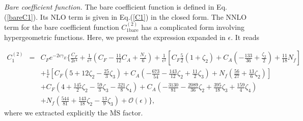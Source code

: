\documentclass[aps,prl,twocolumn,secnumarabic,notitlepage,superscriptaddress,nofootinbib,tightenlines,floatfix,preprintnumbers]{revtex4-1}
\newcommand{\nn}{\nonumber}
\renewcommand{\(}{\left(}
\renewcommand{\)}{\right)}
\renewcommand{\[}{\left[}
\renewcommand{\]}{\right]}
\begin{document}
\textit{Bare coefficient function.} The bare coefficient function is defined in Eq. (\ref{bareC1}). Its NLO term is given in Eq.(\ref{C1}) in the closed form. The NNLO term for the bare coefficient function $C_{1\text{bare}}^{(2)}$ has a complicated form involving hypergeometric functions. Here, we present the expression expanded in $\epsilon$. It reads
\begin{widetext}
\begin{eqnarray}\label{C2}
C_1^{(2)}&=& C_F e^{-2\epsilon \gamma_E}\Bigg\{
\frac{C_F}{2\epsilon^4}
+\frac{1}{\epsilon^3}\(C_F-\frac{11}{12}C_A+\frac{N_f}{6}\)
+\frac{1}{\epsilon^2}\[
C_F\frac{5}{2}(1+\zeta_2)
+C_A\(-\frac{133}{36}+\frac{\zeta_2}{2}\) +\frac{11}{18}N_f\]
\\\nn &&
+\frac{1}{\epsilon}\[ C_F\(5+12\zeta_2-\frac{25}{3}\zeta_3\) 
+C_A\(-\frac{673}{54}-\frac{143}{12}\zeta_2+\frac{11}{2}\zeta_3\)
+N_f\(\frac{56}{27}+\frac{13}{6}\zeta_2\)\]
\\\nn &&
+C_F\(4+\frac{145}{2}\zeta_2-\frac{59}{3}\zeta_3-\frac{321}{8}\zeta_4\) 
+C_A\(-\frac{3130}{81}-\frac{2089}{36}\zeta_2+\frac{395}{18}\zeta_3+\frac{159}{4}\zeta_4\)
\\\nn &&
+N_f\(\frac{544}{81}+\frac{143}{18}\zeta_2-\frac{13}{9}\zeta_3\)
+\mathcal{O}(\epsilon)\Bigg\},
\end{eqnarray}    
where we extracted explicitly the $\overline{\text{MS}}$ factor.


\end{widetext}
\end{document}
